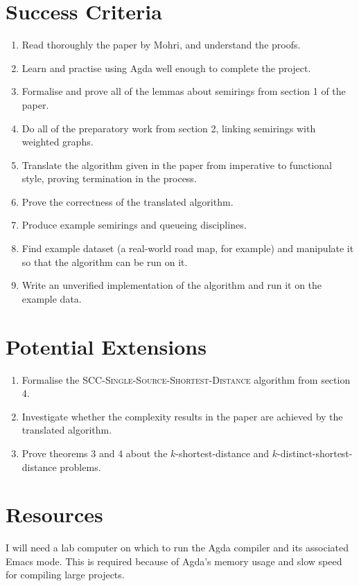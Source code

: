 \section*{Success Criteria}
\begin{enumerate}
  \item
    Read thoroughly the paper by Mohri, and understand the proofs.
  \item
    Learn and practise using Agda well enough to complete the project.
  \item
    Formalise and prove all of the lemmas about semirings from section 1 of the paper.
  \item
    Do all of the preparatory work from section 2, linking semirings with weighted graphs.
  \item
    Translate the algorithm given in the paper from imperative to functional style, proving termination in the process.
  \item
    Prove the correctness of the translated algorithm.
  \item
    Produce example semirings and queueing disciplines.
  \item
    Find example dataset (a real-world road map, for example) and manipulate it so that the algorithm can be run on it.
  \item
    Write an unverified implementation of the algorithm and run it on the example data.
\end{enumerate}

\section*{Potential Extensions}
\begin{enumerate}
  \item
    Formalise the \textsc{SCC-Single-Source-Shortest-Distance} algorithm from section 4.
  \item
    Investigate whether the complexity results in the paper are achieved by the translated algorithm.
  \item
    Prove theorems 3 and 4 about the $k$-shortest-distance and $k$-distinct-shortest-distance problems.
\end{enumerate}

\section*{Resources}
I will need a lab computer on which to run the Agda compiler and its associated Emacs mode. This is required because of Agda's memory usage and slow speed for compiling large projects.

